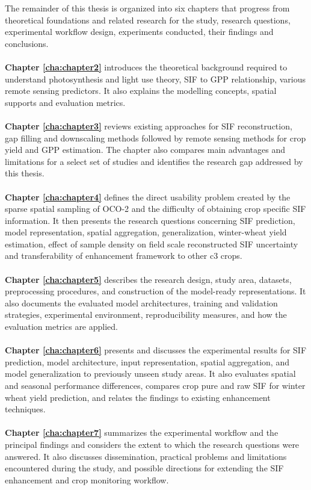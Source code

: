 The remainder of this thesis is organized into six chapters that progress from theoretical foundations and related research for the study, research questions, experimental workflow design, experiments conducted, their findings and conclusions.
\\
\\
\textbf{Chapter \ref{cha:chapter2}} introduces the theoretical background required to understand photosynthesis and light use theory, SIF to GPP relationship, various remote sensing predictors. It also explains the modelling concepts, spatial supports and evaluation metrics.
\\
\\
\textbf{Chapter \ref{cha:chapter3}} reviews existing approaches for SIF reconstruction, gap filling and downscaling methods followed by remote sensing methods for crop yield and GPP estimation. The chapter also compares main advantages and limitations for a select set of studies and identifies the research gap addressed by this thesis. 
\\
\\
\textbf{Chapter \ref{cha:chapter4}} defines the direct usability problem created by the sparse spatial sampling of OCO-2 and the difficulty of obtaining crop specific SIF information. It then presents the research questions concerning SIF prediction, model representation, spatial aggregation, generalization, winter-wheat yield estimation, effect of sample density on field scale reconstructed SIF uncertainty and transferability of enhancement framework to other c3 crops. 
\\
\\
\textbf{Chapter \ref{cha:chapter5}} describes the research design, study area, datasets, preprocessing procedures, and construction of the model-ready representations. It also documents the evaluated model architectures, training and validation strategies, experimental environment, reproducibility measures, and how the evaluation metrics are applied. 
\\
\\
\textbf{Chapter \ref{cha:chapter6}} presents and discusses the experimental results for SIF prediction, model architecture, input representation, spatial aggregation, and model generalization to previously unseen study areas. It also evaluates spatial and seasonal performance differences, compares crop pure and raw SIF for winter wheat yield prediction, and relates the findings to existing enhancement techniques.
\\
\\
\textbf{Chapter \ref{cha:chapter7}} summarizes the experimental workflow and the principal findings and considers the extent to which the research questions were answered. It also discusses dissemination, practical problems and limitations encountered during the study, and possible directions for extending the SIF enhancement and crop monitoring workflow.
